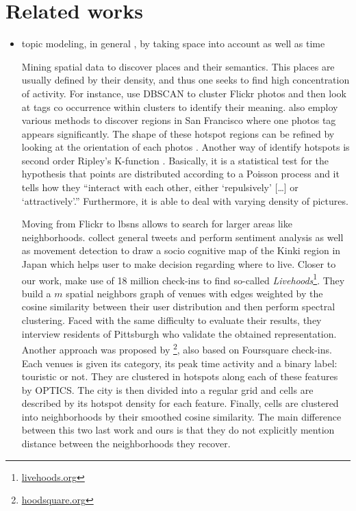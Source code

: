 \chapter{Related works}
\label{chap:related}

\begin{itemize}

\item topic modeling, in general \autocite{topicModel}, by taking space into
account \autocite{GeoTopicYin11, GeoTopicKurashima2013, nestedChinese13,%
NonGaussianTopicKling14} as well as time \autocite{GeoScope, TwitterBurst13}

Mining spatial data to discover places and their semantics. This places are
usually defined by their density, and thus one seeks to find high concentration
of activity. For instance, \textcite{Deng2009} use DBSCAN to cluster Flickr
photos and then look at tags co occurrence within clusters to identify their
meaning. \Textcite{Rattenbury2009} also employ various methods to discover
regions in San Francisco where one photos tag appears significantly. The shape
of these hotspot regions can be refined by looking at the orientation of each
photos \autocite{Hotspots12}. Another way of identify hotspots is second order
Ripley's K-function \autocite{TagHotspot12}. Basically, it is a statistical
test for the hypothesis that points are distributed according to a Poisson
process and it tells how they \enquote{interact with each other, either
\enquote{repulsively} [\dots] or \enquote{attractively}.} Furthermore, it is
able to deal with varying density of pictures.

Moving from Flickr to \glspl{lbsn} allows to search for larger areas like
neighborhoods. \Textcite{SocioMap12} collect general tweets and perform
sentiment analysis as well as movement detection to draw a socio cognitive map
of the Kinki region in Japan which helps user to make decision regarding where
to live. Closer to our work, \textcite{Livehoods12} make use of 18 million
check-ins to find so-called
\emph{Livehoods}\footnote{\href{http://livehoods.org/}{\url{livehoods.org}}}.
They build a $m$ spatial neighbors graph of venues with edges weighted by the
cosine similarity between their user distribution and then perform spectral
clustering. Faced with the same difficulty to evaluate their results, they
interview residents of Pittsburgh who validate the obtained representation.
Another approach was proposed by
\textcite{Hoodsquare13}\footnote{\href{http://pizza.cl.cam.ac.uk/hoodsquare/}%
{\url{hoodsquare.org}}}, also based on Foursquare check-ins.  Each
venues is given its category, its peak time activity and a binary
label: touristic or not. They are clustered in hotspots along each of
these features by OPTICS. The city is then divided into a regular grid
and cells are described by its hotspot density for each feature.
 Finally, cells are clustered into neighborhoods
by their smoothed cosine similarity. The main difference between this two last
work and ours is that they do not explicitly mention distance between the
neighborhoods they recover.


\end{itemize}
